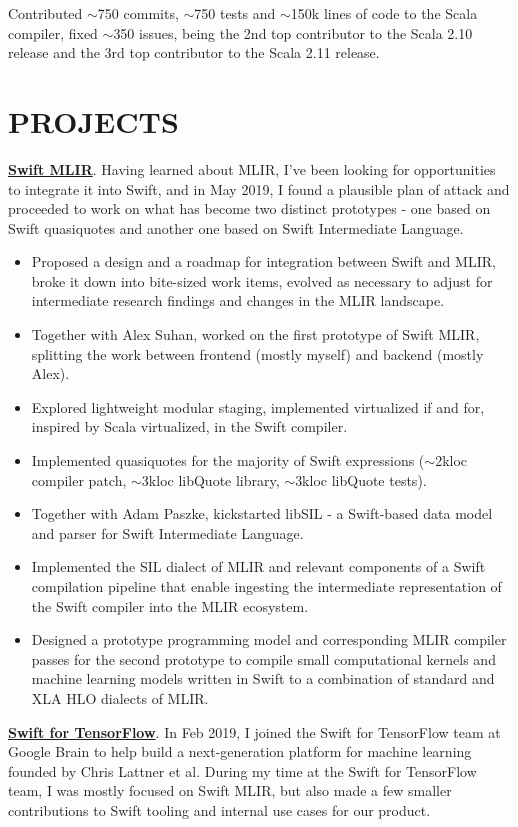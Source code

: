 \documentclass[margin, 10pt]{Stylesheet}
\begin{document}
\begin{resume}
Contributed $\sim$750 commits, $\sim$750 tests and $\sim$150k lines of code to the Scala compiler,
fixed $\sim$350 issues, being the 2nd top contributor to the Scala 2.10 release
and the 3rd top contributor to the Scala 2.11 release.

\section{PROJECTS}

\textbf{\href{http://go/swift-mlir}{Swift MLIR}}. Having learned about MLIR,
I've been looking for opportunities to integrate it into Swift, and in May 2019,
I found a plausible plan of attack and proceeded to work on what has become two
distinct prototypes - one based on Swift quasiquotes and another one based on Swift
Intermediate Language.

\begin{itemize} \itemsep -2pt
\item Proposed a design and a roadmap for integration between Swift and MLIR,
broke it down into bite-sized work items, evolved as necessary to adjust for
intermediate research findings and changes in the MLIR landscape.
\item Together with Alex Suhan, worked on the first prototype of Swift MLIR,
splitting the work between frontend (mostly myself) and backend (mostly Alex).
\item Explored lightweight modular staging, implemented virtualized if and for,
inspired by Scala virtualized, in the Swift compiler.
\item Implemented quasiquotes for the majority of Swift expressions
($\sim$2kloc compiler patch, $\sim$3kloc libQuote library, $\sim$3kloc libQuote tests).
\item Together with Adam Paszke, kickstarted libSIL - a Swift-based data model
and parser for Swift Intermediate Language.
\item Implemented the SIL dialect of MLIR and relevant components of a Swift
compilation pipeline that enable ingesting the intermediate representation of
the Swift compiler into the MLIR ecosystem.
\item Designed a prototype programming model and corresponding MLIR compiler
passes for the second prototype to compile small computational kernels and
machine learning models written in Swift to a combination of standard and
XLA HLO dialects of MLIR.
\end{itemize}

\textbf{\href{https://github.com/tensorflow/swift}{Swift for TensorFlow}}.
In Feb 2019, I joined the Swift for TensorFlow team at Google Brain to help build
a next-generation platform for machine learning founded by Chris Lattner et al.
During my time at the Swift for TensorFlow team, I was mostly focused on Swift MLIR,
but also made a few smaller contributions to Swift tooling and internal use cases
for our product.


\end{resume}
\end{document}
